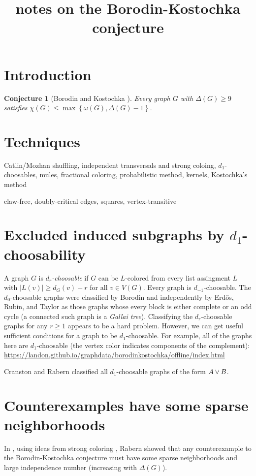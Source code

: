 \documentclass[12pt]{article}
\title{notes on the Borodin-Kostochka conjecture}
\author{}
\theoremstyle{plain}
\newtheorem{conjecture}[thm]{Conjecture}
\theoremstyle{definition}
\theoremstyle{remark}
\newcommand{\set}[1]{\left\{ #1 \right\}}
\newcommand{\card}[1]{\left|#1\right|}
\newcommand{\join}[2]{#1 \mbox{\hspace{2 pt}$\vee$\hspace{2 pt}} #2}
\begin{document}
\maketitle

\section{Introduction}
\begin{conjecture}[Borodin and Kostochka \cite{borodin1977upper}]
Every graph $G$ with $\Delta(G) \ge 9$ satisfies $\chi(G) \le \max\set{\omega(G), \Delta(G) - 1}$.
\end{conjecture}

\section{Techniques}
Catlin/Mozhan shuffling, independent transversals and strong coloing, $d_1$-choosables, mules, fractional coloring, probabilistic method, kernels, Kostochka's method

claw-free, doubly-critical edges, squares, vertex-transitive

\section{Excluded induced subgraphs by $d_1$-choosability}\label{d1choosable}
A graph $G$ is \emph{$d_r$-choosable} if $G$ can be $L$-colored from every list assingment $L$ with $\card{L(v)} \ge d_G(v) - r$ for all $v \in V(G)$.
Every graph is $d_{-1}$-choosable.  
The $d_0$-choosable graphs were classified by Borodin \cite{borodin1977criterion} and independently by Erd\H{o}s, Rubin, and Taylor \cite{erdos1979choosability} as those
graphs whose every block is either complete or an odd cycle (a connected such graph is a \emph{Gallai tree}).  Classifying the $d_r$-choosable graphs for any $r \ge 1$ appears
to be a hard problem.  However, we can get useful sufficient conditions for a graph to be $d_1$-choosable.  For example, all of the graphs here are $d_1$-choosable (the vertex color indicates
components of the complement): \url{https://landon.github.io/graphdata/borodinkostochka/offline/index.html}

Cranston and Rabern \cite{mules} classified all $d_1$-choosable graphs of the form $\join{A}{B}$.

\section{Counterexamples have some sparse neighborhoods}\label{sparseneighborhoods}
In \cite{denseneighborhoods}, using ideas from strong coloring \cite{haxell2004strong, aharoni2007independent}, Rabern showed that any counterexample to the 
Borodin-Kostochka conjecture must have some sparse neighborhoods and large independence number (increasing with $\Delta(G)$). 
\end{document}
